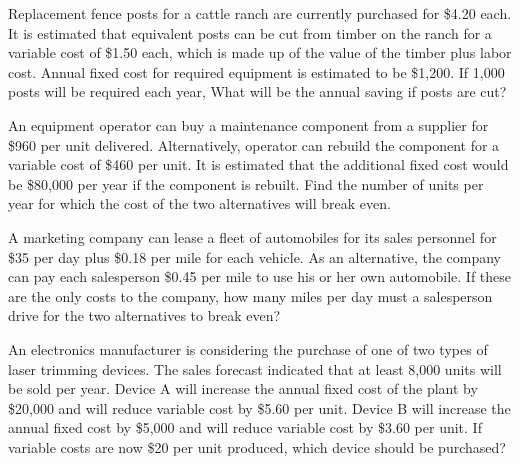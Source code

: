 \begin{exercises}
    \begin{exercise}
    \label{sea-8-18}
        Replacement fence posts for a cattle ranch are currently purchased for \$4.20 each. It is estimated that equivalent posts can be cut from timber on the ranch for a variable cost of \$1.50 each, which is made up of the value of the timber plus labor cost. Annual fixed cost for required equipment is estimated to be \$1,200. If 1,000 posts will be required each year, What will be the annual saving if posts are cut?
    \end{exercise}
    \begin{solution}
    \end{solution}
    
    \begin{exercise}
    \label{sea-8-19}
        An equipment operator can buy a maintenance component from a supplier for \$960 per unit delivered. Alternatively, operator can rebuild the component for a variable cost of \$460 per unit. It is estimated that the additional fixed cost would be \$80,000 per year if the component is rebuilt. Find the number of units per year for which the cost of the two alternatives will break even.
    \end{exercise}
    \begin{solution}
    \end{solution}
    
    \begin{exercise}
    \label{sea-8-20}
        A marketing company can lease a fleet of automobiles for its sales personnel for \$35 per day plus \$0.18 per mile for each vehicle. As an alternative, the company can pay each salesperson \$0.45 per mile to use his or her own automobile. If these are the only costs to the company, how many miles per day must a salesperson drive for the two alternatives to break even?
    \end{exercise}
    \begin{solution}
    \end{solution}
    
    \begin{exercise}
    \label{sea-8-21}
        An electronics manufacturer is considering the purchase of one of two types of laser trimming devices. The sales forecast indicated that at least 8,000 units will be sold per year. Device A will increase the annual fixed cost of the plant by \$20,000 and will reduce variable cost by \$5.60 per unit. Device B will increase the annual fixed cost by \$5,000 and will reduce variable cost by \$3.60 per unit. If variable costs are now \$20 per unit produced, which device should be purchased?
    \end{exercise}
    \begin{solution}
    \end{solution}
    

\end{exercises}
